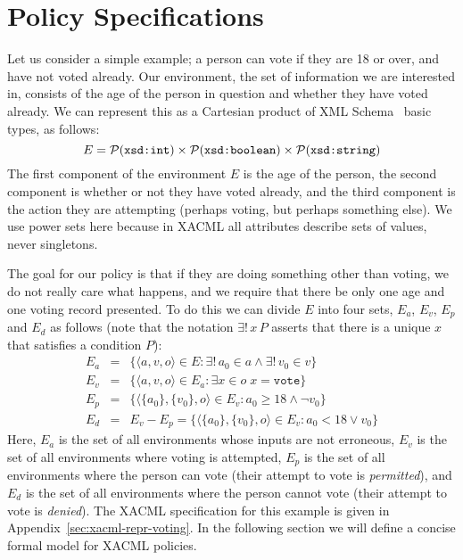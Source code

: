 \section{Policy Specifications}
\label{sec:policy-spec}

Let us consider a simple example; a person can vote if they are 18 or
over, and have not voted already.  Our environment, the set of
information we are interested in, consists of the age of the person in
question and whether they have voted already.  We can represent this
as a Cartesian product of XML Schema~\cite{xmlschema} basic types,
as follows:
\begin{equation*}
  E = \mathcal{P} (\text{\texttt{xsd:int}}) \times \mathcal{P} (\text{\texttt{xsd:boolean}})
  \times \mathcal{P} (\text{\texttt{xsd:string}})
  \label{eqn:env}
\end{equation*}
The first component of the environment $E$ is the age of the
person, the second component is whether or not they have voted
already, and the third component is the action they are attempting
(perhaps voting, but perhaps something else).  We use power sets here
because in XACML all attributes describe sets of values, never
singletons.

The goal for our policy is that if they are doing something other than
voting, we do not really care what happens, and we require that there
be only one age and one voting record presented.  To do this we can
divide $E$ into four sets, $E_a$, $E_v$, $E_p$ and $E_d$ as follows
(note that the notation $\exists ! \, x \, P$ asserts that there is a
unique $x$ that satisfies a condition $P$):
\begin{eqnarray*}
  E_a & = & \{ \langle a, v, o \rangle \in E : \exists ! \, a_0 \in a 
  \wedge \exists ! \, v_0 \in v \} \\
  E_v & = & \{ \langle a, v, o \rangle \in E_a : \exists x \in o \; 
  x = \texttt{vote} \} \\
  E_p & = & \{ \langle \{a_0\}, \{v_0\}, o \rangle \in E_v : a_0 \geq 18 
  \wedge \neg v_0 \} \\
  E_d & = & E_v - E_p 
   =  \{ \langle \{a_0\}, \{v_0\}, o \rangle \in E_v : a_0 < 18 \vee v_0 \}
\end{eqnarray*}
Here, $E_a$ is the set of all environments whose inputs are not
erroneous, $E_v$ is the set of all environments where voting is
attempted, $E_p$ is the set of all environments where the person can
vote (their attempt to vote is \emph{permitted}), and $E_d$ is the set
of all environments where the person cannot vote (their attempt to
vote is \emph{denied}).  The XACML specification for this example is
given in Appendix~\ref{sec:xacml-repr-voting}.  In the following
section we will define a concise formal model for XACML policies.

